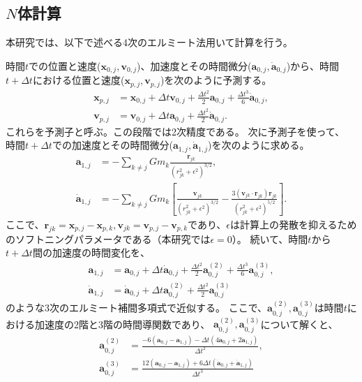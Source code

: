\documentclass[a4paper,10pt,oneside,twocolumn,notitlepage,final]{jarticle}
\begin{document}
\subsection{$N$体計算}
本研究では、以下で述べる4次のエルミート法\citep{Makino1992}用いて計算を行う。

時間$t$での位置と速度(${\bm x}_{0,j},{\bm v}_{0,j}$)、加速度とその時間微分(${\bm a}_{0,j},\dot{{\bm a}}_{0,j}$)から、時間$t + \Delta t$における位置と速度(${\bm x}_{p,j} , {\bm v}_{p,j}$)を次のように予測する。
\begin{align}
{\bm x}_{p,j} &= {\bm x}_{0,j} + \Delta t {\bm v}_{0,j} + \frac{\Delta t ^2}{2} {\bm a}_{0,j} + \frac{\Delta t ^3}{6} \dot{{\bm a}}_{0,j},\\
{\bm v}_{p,j} &= {\bm v}_{0,j} + \Delta t {\bm a}_{0,j} + \frac{\Delta t ^2}{2} \dot{{\bm a}}_{0,j}.
\end{align}
これらを予測子と呼ぶ。この段階では2次精度である。
次に予測子を使って、 時間$t + \Delta t$での加速度とその時間微分(${\bm a}_{1,j},\dot{{\bm a}}_{1,j}$)を次のように求める。
\begin{align}
{\bm a}_{1,j} &= - \sum_{k \not= j} G m_k \frac{{\bm r}_{jk}}{(r_{jk}^2 + \epsilon^2)^{3/2}}, \label{eq:a1j}\\
\dot{{\bm a}}_{1,j} &= - \sum_{k \not= j} G m_k \left[ \frac{{\bm v}_{jk}}{(r_{jk}^2 + \epsilon^2)^{3/2}} - \frac{3 ( {\bm v}_{jk} \cdot {\bm r}_{jk} ) {\bm r}_{jk} }{(r_{jk}^2 + \epsilon^2)^{5/2}} \right]. \label{eq:adot1j}
\end{align}
ここで、${\bm r}_{jk} = {\bm x}_{p,j} - {\bm x}_{p,k},{\bm v}_{jk} = {\bm v}_{p,j} - {\bm v}_{p,k}$であり、$\epsilon$は計算上の発散を抑えるためのソフトニングパラメータである（本研究では$\epsilon=0$）。
続いて、時間$t$から$t+\Delta t$間の加速度の時間変化を、
\begin{align}
{\bm a}_{1,j} &= {\bm a}_{0,j} + \Delta t \dot{{\bm a}}_{0,j} + \frac{\Delta t ^2}{2} {\bm a}_{0,j}^{(2)} + \frac{\Delta t ^3}{6} {\bm a}_{0,j}^{(3)},\\
\dot{{\bm a}}_{1,j} &= \dot{{\bm a}}_{0,j} + \Delta t {\bm a}_{0,j}^{(2)} + \frac{\Delta t ^2}{2} {\bm a}_{0,j}^{(3)}
\end{align}
のような3次のエルミート補間多項式で近似する。
ここで、${\bm a}_{0,j}^{(2)},{\bm a}_{0,j}^{(3)}$は時間$t$における加速度の2階と3階の時間導関数であり、
${\bm a}_{0,j}^{(2)},{\bm a}_{0,j}^{(3)}$について解くと、
\begin{align}
{\bm a}_{0,j}^{(2)} &= \frac{- 6 ({\bm a}_{0,j} - {\bm a}_{1,j}) - \Delta t (4 \dot{{\bm a}}_{0,j} + 2 \dot{{\bm a}}_{1,j})}{\Delta t ^2},\\
{\bm a}_{0,j}^{(3)} &= \frac{12 ({\bm a}_{0,j} - {\bm a}_{1,j}) + 6 \Delta t (\dot{{\bm a}}_{0,j} + \dot{{\bm a}}_{1,j})}{\Delta t ^3}
\end{align}
\end{document}
